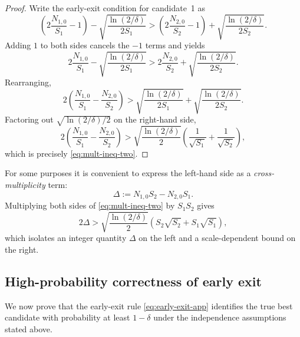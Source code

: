 \documentclass[11pt]{article}
\begin{document}
\begin{proof}
Write the early-exit condition for candidate~1 as
\begin{equation}
  \left(2\frac{N_{1,0}}{S_1} - 1\right)
  - \sqrt{\frac{\ln(2/\delta)}{2 S_1}}
  >
  \left(2\frac{N_{2,0}}{S_2} - 1\right)
  + \sqrt{\frac{\ln(2/\delta)}{2 S_2}}.
\end{equation}
Adding \(1\) to both sides cancels the \(-1\) terms and yields
\begin{equation}
  2\frac{N_{1,0}}{S_1}
  - \sqrt{\frac{\ln(2/\delta)}{2 S_1}}
  >
  2\frac{N_{2,0}}{S_2}
  + \sqrt{\frac{\ln(2/\delta)}{2 S_2}}.
\end{equation}
Rearranging,
\begin{equation}
  2\left(\frac{N_{1,0}}{S_1} - \frac{N_{2,0}}{S_2}\right)
  >
  \sqrt{\frac{\ln(2/\delta)}{2 S_1}}
  + \sqrt{\frac{\ln(2/\delta)}{2 S_2}}.
\end{equation}
Factoring out \(\sqrt{\ln(2/\delta)/2}\) on the right-hand side,
\begin{equation}
  2\left(\frac{N_{1,0}}{S_1} - \frac{N_{2,0}}{S_2}\right)
  >
  \sqrt{\frac{\ln(2/\delta)}{2}}
  \left(
    \frac{1}{\sqrt{S_1}}
    +
    \frac{1}{\sqrt{S_2}}
  \right),
\end{equation}
which is precisely \eqref{eq:mult-ineq-two}.
\end{proof}

For some purposes it is convenient to express the left-hand side as a
\emph{cross-multiplicity} term:
\begin{equation}
  \Delta
  :=
  N_{1,0} S_2 - N_{2,0} S_1.
\end{equation}
Multiplying both sides of \eqref{eq:mult-ineq-two} by \(S_1 S_2\) gives
\begin{equation}
  2 \Delta
  >
  \sqrt{\frac{\ln(2/\delta)}{2}}
  \left(
    S_2 \sqrt{S_2} + S_1 \sqrt{S_1}
  \right),
\end{equation}
which isolates an integer quantity \(\Delta\) on the left and a
scale-dependent bound on the right.

\subsection{High-probability correctness of early exit}
\label{app:hoeffding}

We now prove that the early-exit rule \eqref{eq:early-exit-app}
identifies the true best candidate with probability at least \(1-\delta\)
under the independence assumptions stated above.
\end{document}

